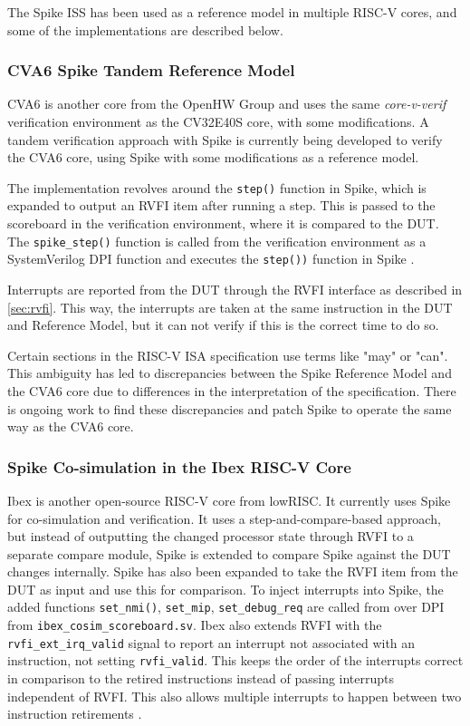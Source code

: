 The Spike ISS has been used as a reference model in multiple RISC-V cores, and some of the implementations are described below.

\subsubsection{CVA6 Spike Tandem Reference Model}
\label{back:cva6}

CVA6 is another core from the OpenHW Group and uses the same \textit{core-v-verif} verification environment as the CV32E40S core, with some modifications. A tandem verification approach with Spike is currently being developed to verify the CVA6 core, using Spike with some modifications as a reference model.

The implementation revolves around the \lstinline{step()} function in Spike, which is expanded to output an RVFI item after running a step. This is passed to the scoreboard in the verification environment, where it is compared to the DUT. The \lstinline{spike_step()} function is called from the verification environment as a SystemVerilog DPI function and executes the \lstinline{step())} function in Spike \cite{openhwgroupOpenhwgroupCorevverif2023}.

Interrupts are reported from the DUT through the RVFI interface as described in \cref{sec:rvfi}. This way, the interrupts are taken at the same instruction in the DUT and Reference Model, but it can not verify if this is the correct time to do so.

Certain sections in the RISC-V ISA specification use terms like "may" or "can". This ambiguity has led to discrepancies between the Spike Reference Model and the CVA6 core due to differences in the interpretation of the specification. There is ongoing work to find these discrepancies \cite{CVA6CSRSpike} and patch Spike to operate the same way as the CVA6 core. 


\subsubsection{Spike Co-simulation in the Ibex RISC-V Core}
\label{back:Ibex}

Ibex is another open-source RISC-V core from lowRISC. It currently uses Spike for co-simulation and verification. It uses a step-and-compare-based approach, but instead of outputting the changed processor state through RVFI to a separate compare module, Spike is extended to compare Spike against the DUT changes internally. Spike has also been expanded to take the RVFI item from the DUT as input and use this for comparison. To inject interrupts into Spike, the added functions \lstinline{set_nmi()}, \lstinline{set_mip}, \lstinline{set_debug_req} are called from over DPI from \lstinline{ibex_cosim_scoreboard.sv}.
Ibex also extends RVFI with the \lstinline{rvfi_ext_irq_valid} signal to report an interrupt not associated with an instruction, not setting \lstinline{rvfi_valid}. This keeps the order of the interrupts correct in comparison to the retired instructions instead of passing interrupts independent of RVFI. This also allows multiple interrupts to happen between two instruction retirements \cite{ethzurichanduniversityofbolognaCosimulationSystem2023}. 

